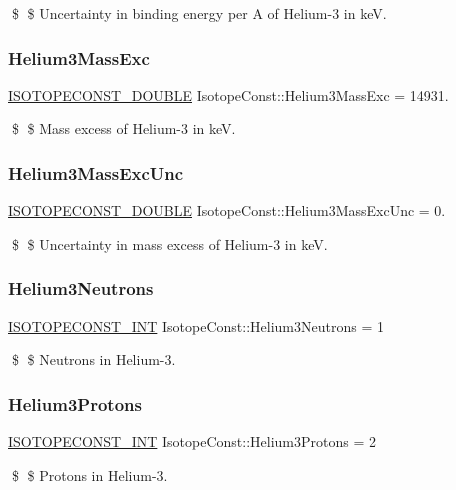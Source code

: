 \$ \$ Uncertainty in binding energy per A of Helium-\/3 in keV. \mbox{\label{group___isotope_const-_helium-_he3_ga63ae3659b49b0cb1a4dec3f0a4fdf26a}} 
\subsubsection{\texorpdfstring{Helium3\+Mass\+Exc}{Helium3MassExc}}
{\footnotesize\ttfamily \mbox{\hyperlink{group___isotope_const-_macros_ga8f45a7272ce02c0b4c65c44636ed719a}{I\+S\+O\+T\+O\+P\+E\+C\+O\+N\+S\+T\+\_\+\+D\+O\+U\+B\+LE}} Isotope\+Const\+::\+Helium3\+Mass\+Exc = 14931.}

\$ \$ Mass excess of Helium-\/3 in keV. \mbox{\label{group___isotope_const-_helium-_he3_gacc1d485aa78c3cc417c3a9f4fa81bfd7}} 
\subsubsection{\texorpdfstring{Helium3\+Mass\+Exc\+Unc}{Helium3MassExcUnc}}
{\footnotesize\ttfamily \mbox{\hyperlink{group___isotope_const-_macros_ga8f45a7272ce02c0b4c65c44636ed719a}{I\+S\+O\+T\+O\+P\+E\+C\+O\+N\+S\+T\+\_\+\+D\+O\+U\+B\+LE}} Isotope\+Const\+::\+Helium3\+Mass\+Exc\+Unc = 0.}

\$ \$ Uncertainty in mass excess of Helium-\/3 in keV. \mbox{\label{group___isotope_const-_helium-_he3_ga7804b84fbf7df30ac09e9354c3977870}} 
\subsubsection{\texorpdfstring{Helium3\+Neutrons}{Helium3Neutrons}}
{\footnotesize\ttfamily \mbox{\hyperlink{group___isotope_const-_macros_ga5f18360b3e99483a35c32d789e62621c}{I\+S\+O\+T\+O\+P\+E\+C\+O\+N\+S\+T\+\_\+\+I\+NT}} Isotope\+Const\+::\+Helium3\+Neutrons = 1}

\$ \$ Neutrons in Helium-\/3. \mbox{\label{group___isotope_const-_helium-_he3_ga16b1194f5a200cbb4782b7da75a4fd84}} 
\subsubsection{\texorpdfstring{Helium3\+Protons}{Helium3Protons}}
{\footnotesize\ttfamily \mbox{\hyperlink{group___isotope_const-_macros_ga5f18360b3e99483a35c32d789e62621c}{I\+S\+O\+T\+O\+P\+E\+C\+O\+N\+S\+T\+\_\+\+I\+NT}} Isotope\+Const\+::\+Helium3\+Protons = 2}

\$ \$ Protons in Helium-\/3. 